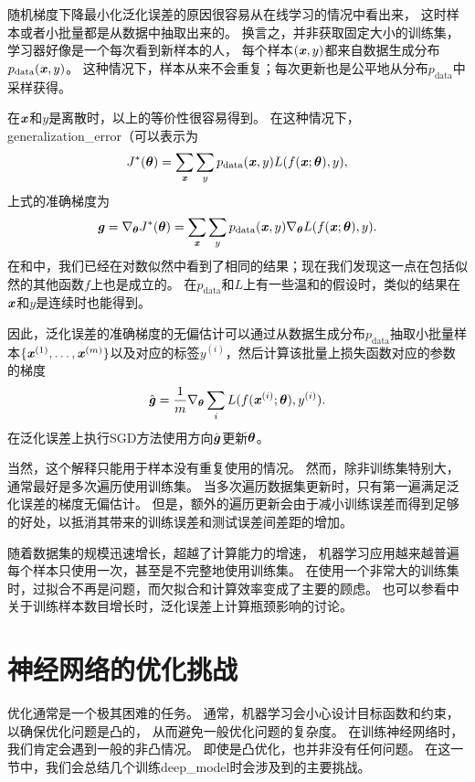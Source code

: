 
随机梯度下降最小化泛化误差的原因很容易从在线学习的情况中看出来，
这时样本或者小批量都是从数据中抽取出来的。
换言之，并非获取固定大小的训练集，学习器好像是一个每次看到新样本的人，
每个样本$(\boldsymbol{\mathit{x}},y)$都来自数据生成分布$p_{\text{data}}(\boldsymbol{\mathit{x}},y)$。
这种情况下，样本从来不会重复；每次更新也是公平地从分布$p_\text{data}$中采样获得。

在$\boldsymbol{\mathit{x}}$和$y$是离散时，以上的等价性很容易得到。
在这种情况下，\gls{generalization_error}（可以表示为
\begin{equation}
\label{eq:8.7}
    J^*(\boldsymbol{\theta}) = \sum_{\boldsymbol{\mathit{x}}} \sum_y p_{\text{data}}(\boldsymbol{\mathit{x}}, y) L(f(\boldsymbol{\mathit{x}}; \boldsymbol{\theta}),y),
\end{equation}
上式的准确梯度为
\begin{equation}
\label{eq:8.8}
    \boldsymbol{\mathit{g}} = \nabla_{\boldsymbol{\theta}} J^*(\boldsymbol{\theta}) = \sum_{\boldsymbol{\mathit{x}}} \sum_y p_{\text{data}}
    (\boldsymbol{\mathit{x}}, y) \nabla_{\boldsymbol{\theta}} L(f(\boldsymbol{\mathit{x}};\boldsymbol{\theta}),y) .
\end{equation}
在和中，我们已经在对数似然中看到了相同的结果；现在我们发现这一点在包括似然的其他函数$f$上也是成立的。
在$p_\text{data}$和$L$上有一些温和的假设时，类似的结果在$\boldsymbol{\mathit{x}}$和$y$是连续时也能得到。

因此，泛化误差的准确梯度的无偏估计可以通过从数据生成分布$p_\text{data}$抽取小批量样本$\{ \boldsymbol{\mathit{x}}^{(1)}, \dots,\boldsymbol{\mathit{x}}^{(m)} \}$以及对应的标签$y^{(i)}$，然后计算该批量上损失函数对应的参数的梯度
\begin{equation}
\label{eq:8.9}
    \hat{\boldsymbol{\mathit{g}}} = \frac{1}{m} \nabla_{\boldsymbol{\theta}} \sum_i L(f(\boldsymbol{\mathit{x}}^{(i)};\boldsymbol{\theta}),y^{(i)} ).
\end{equation}
在泛化误差上执行SGD方法使用方向$\hat{\boldsymbol{\mathit{g}}}$更新$\boldsymbol{\theta}$。

当然，这个解释只能用于样本没有重复使用的情况。
然而，除非训练集特别大，通常最好是多次遍历使用训练集。
当多次遍历数据集更新时，只有第一遍满足泛化误差的梯度无偏估计。
但是，额外的遍历更新会由于减小训练误差而得到足够的好处，以抵消其带来的训练误差和测试误差间差距的增加。


随着数据集的规模迅速增长，超越了计算能力的增速，
机器学习应用越来越普遍每个样本只使用一次，甚至是不完整地使用训练集。
在使用一个非常大的训练集时，过拟合不再是问题，而欠拟合和计算效率变成了主要的顾虑。
也可以参看\cite{bottou-bousquet-2008}中关于训练样本数目增长时，泛化误差上计算瓶颈影响的讨论。

\section{神经网络的优化挑战}
\label{sec:challenges_in_neural_network_optimization}
优化通常是一个极其困难的任务。
通常，机器学习会小心设计目标函数和约束，以确保优化问题是凸的，
从而避免一般优化问题的复杂度。
在训练神经网络时，我们肯定会遇到一般的非凸情况。
即使是凸优化，也并非没有任何问题。
在这一节中，我们会总结几个训练\gls{deep_model}时会涉及到的主要挑战。

